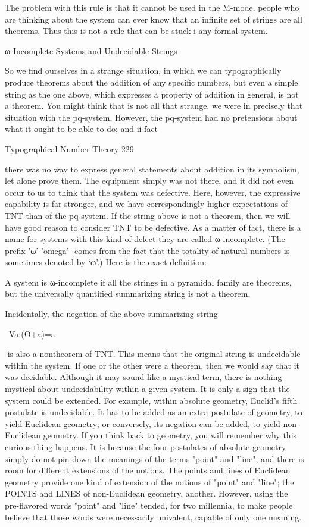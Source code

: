 The problem with this rule is that it cannot be used in the M-mode. people who are
thinking about the system can ever know that an infinite set of strings are all theorems.
Thus this is not a rule that can be stuck i any formal system.

                ω-Incomplete Systems and Undecidable Strings

So we find ourselves in a strange situation, in which we can typographically produce
theorems about the addition of any specific numbers, but even a simple string as the one
above, which expresses a property of addition in general, is not a theorem. You might
think that is not all that strange, we were in precisely that situation with the pq-system.
However, the pq-system had no pretensions about what it ought to be able to do; and ii
fact




Typographical Number Theory                                                               229

there was no way to express general statements about addition in its symbolism, let alone
prove them. The equipment simply was not there, and it did not even occur to us to think
that the system was defective. Here, however, the expressive capability is far stronger,
and we have correspondingly higher expectations of TNT than of the pq-system. If the
string above is not a theorem, then we will have good reason to consider TNT to be
defective. As a matter of fact, there is a name for systems with this kind of defect-they
are called ω-incomplete. (The prefix 'ω'-'omega'- comes from the fact that the totality of
natural numbers is sometimes denoted by `ω'.) Here is the exact definition:

   A system is ω-incomplete if all the strings in a pyramidal family are theorems, but
   the universally quantified summarizing string is not a theorem.

   Incidentally, the negation of the above summarizing string

                                     ~Va:(O+a)=a

-is also a nontheorem of TNT. This means that the original string is undecidable within
the system. If one or the other were a theorem, then we would say that it was decidable.
Although it may sound like a mystical term, there is nothing mystical about
undecidability within a given system. It is only a sign that the system could be extended.
For example, within absolute geometry, Euclid's fifth postulate is undecidable. It has to
be added as an extra postulate of geometry, to yield Euclidean geometry; or conversely,
its negation can be added, to yield non-Euclidean geometry. If you think back to
geometry, you will remember why this curious thing happens. It is because the four
postulates of absolute geometry simply do not pin down the meanings of the terms
"point" and "line", and there is room for different extensions of the notions. The points
and lines of Euclidean geometry provide one kind of extension of the notions of "point"
and "line"; the POINTS and LINES of non-Euclidean geometry, another. However, using
the pre-flavored words "point" and "line" tended, for two millennia, to make people
believe that those words were necessarily univalent, capable of only one meaning.

